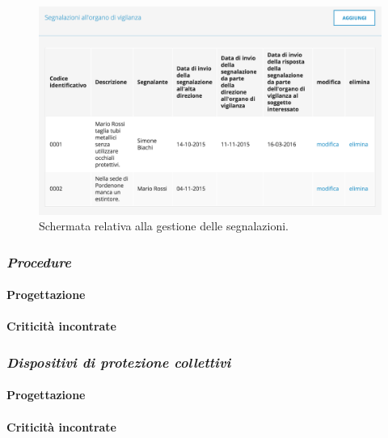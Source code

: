 	\begin{figure}[H]
		\begin{center}
			\includegraphics[width=12cm]{Pics/ScreenSegnalazioni.png}
			\caption{Schermata relativa alla gestione delle segnalazioni.}
			\label{fig:ScreenSegnalazioni}
		\end{center}
	\end{figure}
\newpage
\subsubsection{\textit{Procedure}}

	\paragraph{Progettazione}
	\paragraph{Criticità incontrate}
\newpage
\subsubsection{\textit{Dispositivi di protezione collettivi}}

	\paragraph{Progettazione}
	\paragraph{Criticità incontrate}
		

\newpage
